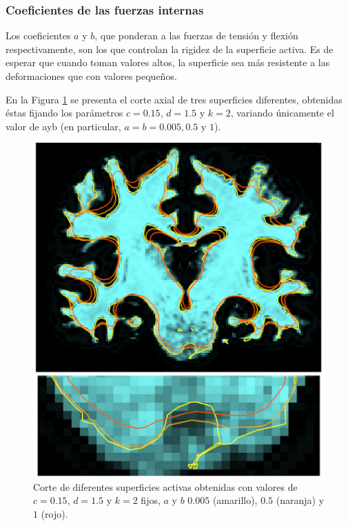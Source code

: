 \subsubsection{Coeficientes de las fuerzas internas}
Los coeficientes $a$ y $b$, que ponderan a las fuerzas de tensión y flexión respectivamente, son
los que controlan la rigidez de la superficie activa. Es de esperar que cuando toman valores altos, la superficie sea más resistente a las deformaciones que con valores pequeños. 

En la Figura \ref{fig:sensibilidad4} se presenta el corte axial de tres superficies diferentes, obtenidas éstas fijando los parámetros $c=0.15$, $d=1.5$ y $k=2$, variando únicamente el valor de ayb (en particular, $a=b=0.005, 0.5 \text{ y } 1$).

\begin{figure}[H]
	\centering
	\includegraphics[scale=0.05]{images/sensibilidad4.jpg}
	\caption{Corte de diferentes superficies activas obtenidas con valores de $c=0.15$, $d=1.5$ y $k=2$ fijos, $a$ y $b$ $0.005$ (amarillo), $0.5$ (naranja) y $1$ (rojo). }
	\label{fig:sensibilidad4}
\end{figure}

